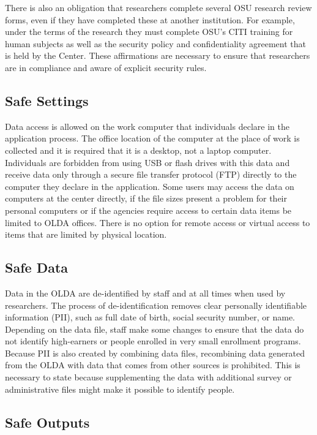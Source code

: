\documentclass[
]{book}
\begin{document}
There is also an obligation that researchers complete several OSU research review forms, even if they have completed these at another institution. For example, under the terms of the research they must complete OSU's CITI training for human subjects as well as the security policy and confidentiality agreement that is held by the Center. These affirmations are necessary to ensure that researchers are in compliance and aware of explicit security rules.

\hypertarget{safe-settings-1}{%
\subsection{Safe Settings}\label{safe-settings-1}}

Data access is allowed on the work computer that individuals declare in the application process. The office location of the computer at the place of work is collected and it is required that it is a desktop, not a laptop computer. Individuals are forbidden from using USB or flash drives with this data and receive data only through a secure file transfer protocol (FTP) directly to the computer they declare in the application. Some users may access the data on computers at the center directly, if the file sizes present a problem for their personal computers or if the agencies require access to certain data items be limited to OLDA offices. There is no option for remote access or virtual access to items that are limited by physical location.

\hypertarget{safe-data-1}{%
\subsection{Safe Data}\label{safe-data-1}}

Data in the OLDA are de-identified by staff and at all times when used by researchers. The process of de-identification removes clear personally identifiable information (PII), such as full date of birth, social security number, or name. Depending on the data file, staff make some changes to ensure that the data do not identify high-earners or people enrolled in very small enrollment programs. Because PII is also created by combining data files, recombining data generated from the OLDA with data that comes from other sources is prohibited. This is necessary to state because supplementing the data with additional survey or administrative files might make it possible to identify people.

\hypertarget{safe-outputs-1}{%
\subsection{Safe Outputs}\label{safe-outputs-1}}
\end{document}
